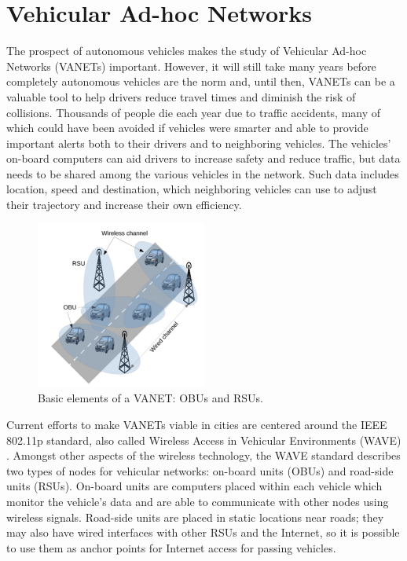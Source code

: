 \chapter{Vehicular Ad-hoc Networks}
\label{chap:vanets}

The prospect of autonomous vehicles makes the study of Vehicular Ad-hoc Networks (VANETs) important.
However, it will still take many years before completely autonomous vehicles are the norm and, until then, VANETs can be a valuable tool to help drivers reduce travel times and diminish the risk of collisions.
Thousands of people die each year due to traffic accidents, many of which could have been avoided if vehicles were smarter and able to provide important alerts both to their drivers and to neighboring vehicles.
The vehicles' on-board computers can aid drivers to increase safety and reduce traffic, but data needs to be shared among the various vehicles in the network.
Such data includes location, speed and destination, which neighboring vehicles can use to adjust their trajectory and increase their own efficiency.

\begin{figure}[h]
    \centering
    \includegraphics[width=0.5\textwidth]{images/vanet.png}
    \caption{Basic elements of a VANET: OBUs and RSUs. \cite{saini2015close}}
    \label{fig:vanet}
\end{figure}

Current efforts to make VANETs viable in cities are centered around the IEEE 802.11p standard, also called Wireless Access in Vehicular Environments (WAVE) \cite{jiang2008ieee}.
Amongst other aspects of the wireless technology, the WAVE standard describes two types of nodes for vehicular networks: on-board units (OBUs) and road-side units (RSUs).
On-board units are computers placed within each vehicle which monitor the vehicle's data and are able to communicate with other nodes using wireless signals.
Road-side units are placed in static locations near roads; they may also have wired interfaces with other RSUs and the Internet, so it is possible to use them as anchor points for Internet access for passing vehicles.

